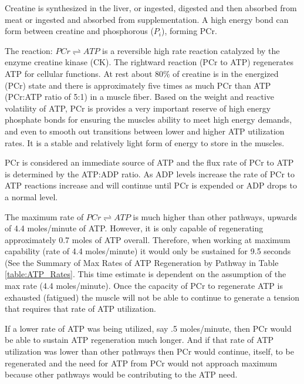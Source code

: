 Creatine is synthesized in the liver, or ingested, digested and then absorbed from meat or ingested and absorbed from supplementation.\footnotemark{} A high energy bond can form between creatine and phosphorous ($P_i$), forming PCr.

The reaction: $PCr \rightleftharpoons ATP$ is a reversible high rate reaction catalyzed by the enzyme creatine kinase (CK). The rightward reaction (PCr to ATP) regenerates ATP for cellular functions. At rest about 80\% of creatine is in the energized (PCr) state and there is approximately five times as much PCr than ATP (PCr:ATP ratio of 5:1) in a muscle fiber. Based on the weight and reactive volatility of ATP, PCr is provides a very important reserve of high energy phosphate bonds for ensuring the muscles ability to meet high energy demands, and even to smooth out transitions between lower and higher ATP utilization rates.\footnotemark{} It is a stable and relatively light form of energy to store in the muscles.

PCr is considered an immediate source of ATP and the flux rate of PCr to ATP is determined by the ATP:ADP ratio. As ADP levels increase the rate of PCr to ATP reactions increase and will continue until PCr is expended or ADP drops to a normal level.

The maximum rate of $PCr \rightleftharpoons ATP$ is much higher than other pathways, upwards of 4.4 moles/minute of ATP. However, it is only capable of regenerating approximately 0.7 moles of ATP overall. Therefore, when working at maximum capability (rate of 4.4 moles/minute) it would only be sustained for 9.5 seconds (See the Summary of Max Rates of ATP Regeneration by Pathway in Table \ref{table:ATP_Rates}. This time estimate is dependent on the assumption of the max rate (4.4 moles/minute). Once the capacity of PCr to regenerate ATP is exhausted (fatigued) the muscle will not be able to continue to generate a tension that requires that rate of ATP utilization.

If a lower rate of ATP was being utilized, say .5 moles/minute, then PCr would be able to sustain ATP regeneration much longer. And if that rate of ATP utilization was lower than other pathways then PCr would continue, itself, to be regenerated and the need for ATP from PCr would not approach maximum because other pathways would be contributing to the ATP need.

